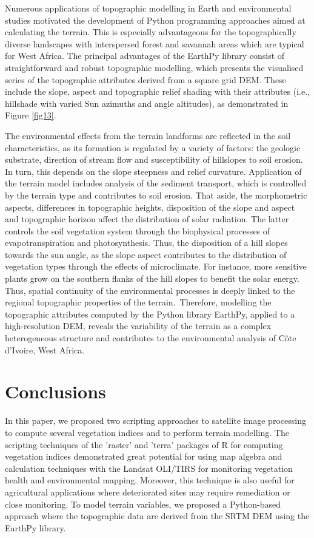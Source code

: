 \documentclass[jimaging,article,accept,pdftex,moreauthors]{Definitions/mdpi}
\begin{document}
Numerous applications of topographic modelling in Earth and environmental studies motivated the development of Python programming approaches aimed at calculating the terrain. This is especially advantageous for the topographically diverse landscapes with interspersed forest and savannah areas which are{ }typical for{ }West Africa. The {principal} advantages of the EarthPy library consist of straightforward and robust topographic modelling, which presents the visualised series of the topographic attributes derived from a square grid DEM. These include the slope, aspect and topographic relief shading with{ }their attributes (i.e., {hillshade with varied }Sun azimuths and angle altitudes), as demonstrated in Figure \ref{fig13}.

The environmental effects from the terrain landforms are reflected in the soil characteristics, as its formation is regulated {by a variety of factors: }the geologic substrate,{ }direction of stream flow{ }and susceptibility of hillslopes to{ }soil erosion{. In turn, this} depends on{ }the slope steepness and relief curvature. Application of the terrain model includes analysis of the sediment transport, which is {controlled by the} terrain type and contributes to soil erosion. That aside, the morphometric aspects, differences {in} topographic heights, disposition of the slope and aspect and topographic horizon affect the distribution of solar radiation{. The latter} controls the soil vegetation system through{ }the biophysical processes of evapotranspiration and photosynthesis. Thus, the disposition of a hill slopes towards the sun angle, as the slope aspect contributes to the distribution of vegetation types through the effects of microclimate. For instance, more sensitive plants grow on the southern flanks of the hill slopes to benefit the solar energy. Thus, spatial continuity of the environmental processes is deeply linked to the regional topographic properties of the terrain.~Therefore, {modelling }the topographic attributes computed by the Python {library EarthPy, applied to a} high-resolution DEM, reveals{ }the variability of the terrain {as a} complex heterogeneous {structure} and contributes{ }to the environmental analysis of Côte d'Ivoire{, West Africa}.

\section{Conclusions}

{In this paper, we proposed two scripting approaches to satellite image processing to compute several vegetation indices and to perform terrain modelling. The scripting techniques of the 'raster' and 'terra' packages of R for computing vegetation indices demonstrated great potential for using map algebra and calculation techniques with the Landsat OLI/TIRS for monitoring vegetation health and environmental mapping. Moreover, this technique is also useful for agricultural applications where deteriorated sites may require remediation or close monitoring. To model terrain variables, we proposed a Python-based approach where the topographic data are derived from the SRTM DEM using the EarthPy library.}
\end{document}
